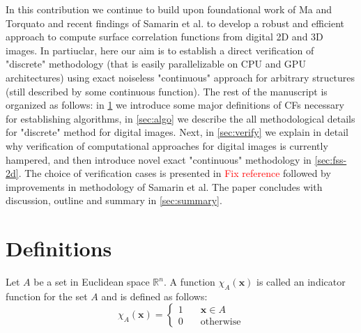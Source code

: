 \documentclass[reprint,amsmath,amssymb,aps,pre,showkeys,showpacs]{revtex4-1}
\begin{document}
In this contribution we continue to build upon foundational work of Ma and
Torquato \cite{ma2018SS} and recent findings of Samarin et al. \cite{our_SS} to
develop a robust and efficient approach to compute surface correlation functions
from digital 2D and 3D images. In partiuclar, here our aim is to establish a
direct verification of "discrete" methodology (that is easily parallelizable on
CPU and GPU architectures) using exact noiseless "continuous" approach for
arbitrary structures (still described by some continuous function). The rest of
the manuscript is organized as follows: in \cref{sec:def} we introduce some
major definitions of CFs necessary for establishing algorithms, in
\cref{sec:algo} we describe the all methodological details for "discrete" method
for digital images. Next, in \cref{sec:verify} we explain in detail why
verification of computational approaches for digital images is currently
hampered, and then introduce novel exact "continuous" methodology in
\cref{sec:fss-2d}. The choice of verification cases is presented in
\textcolor{red}{Fix reference} followed by improvements in methodology of
Samarin et al. The paper concludes with discussion, outline and summary in
\cref{sec:summary}.

\section{Definitions}
\label{sec:def}
Let $A$ be a set in Euclidean space $\mathbb{R}^n$. A function
$\chi_A(\mathbf{x})$ is called an indicator function for the set $A$ and is
defined as follows:
\begin{equation*}
  \chi_A(\bm{x}) = \left\{
  \begin{array}{ll}
    1 & \quad \bm{x} \in A \\
    0 & \quad \text{otherwise}
  \end{array}
  \right.
\end{equation*}
\end{document}
